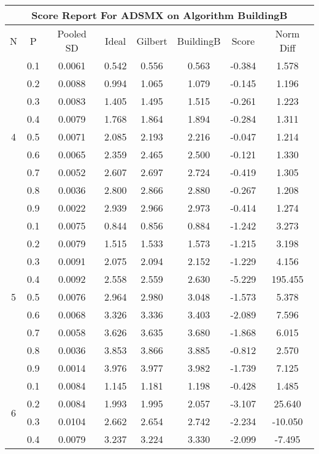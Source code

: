 \documentclass[11pt,a4paper]{report}
\begin{document}
\begin{longtable}{ | c | c || c | c | c | c | c | c | }
\hline
\multicolumn{8}{|c|}{ Score Report For ADSMX on Algorithm BuildingB} \\
\hline
N & P & Pooled SD &  Ideal &  Gilbert & BuildingB  & Score & Norm Diff \\
 \hline
 \hline
 \endhead
\multirow{9}{*}{4} & 0.1 & 0.0061 & 0.542 & 0.556 & 0.563 & -0.384 & 1.578 \\
 & 0.2 & 0.0088 & 0.994 & 1.065 & 1.079 & -0.145 & 1.196 \\
 & 0.3 & 0.0083 & 1.405 & 1.495 & 1.515 & -0.261 & 1.223 \\
 & 0.4 & 0.0079 & 1.768 & 1.864 & 1.894 & -0.284 & 1.311 \\
 & 0.5 & 0.0071 & 2.085 & 2.193 & 2.216 & -0.047 & 1.214 \\
 & 0.6 & 0.0065 & 2.359 & 2.465 & 2.500 & -0.121 & 1.330 \\
 & 0.7 & 0.0052 & 2.607 & 2.697 & 2.724 & -0.419 & 1.305 \\
 & 0.8 & 0.0036 & 2.800 & 2.866 & 2.880 & -0.267 & 1.208 \\
 & 0.9 & 0.0022 & 2.939 & 2.966 & 2.973 & -0.414 & 1.274 \\
 \hline
\multirow{9}{*}{5} & 0.1 & 0.0075 & 0.844 & 0.856 & 0.884 & -1.242 & 3.273 \\
 & 0.2 & 0.0079 & 1.515 & 1.533 & 1.573 & -1.215 & 3.198 \\
 & 0.3 & 0.0091 & 2.075 & 2.094 & 2.152 & -1.229 & 4.156 \\
 & 0.4 & 0.0092 & 2.558 & 2.559 & 2.630 & -5.229 & 195.455 \\
 & 0.5 & 0.0076 & 2.964 & 2.980 & 3.048 & -1.573 & 5.378 \\
 & 0.6 & 0.0068 & 3.326 & 3.336 & 3.403 & -2.089 & 7.596 \\
 & 0.7 & 0.0058 & 3.626 & 3.635 & 3.680 & -1.868 & 6.015 \\
 & 0.8 & 0.0036 & 3.853 & 3.866 & 3.885 & -0.812 & 2.570 \\
 & 0.9 & 0.0014 & 3.976 & 3.977 & 3.982 & -1.739 & 7.125 \\
 \hline
\multirow{9}{*}{6} & 0.1 & 0.0084 & 1.145 & 1.181 & 1.198 & -0.428 & 1.485 \\
 & 0.2 & 0.0084 & 1.993 & 1.995 & 2.057 & -3.107 & 25.640 \\
 & 0.3 & 0.0104 & 2.662 & 2.654 & 2.742 & -2.234 & -10.050 \\
 & 0.4 & 0.0079 & 3.237 & 3.224 & 3.330 & -2.099 & -7.495 \\

\end{longtable}
\end{document}
